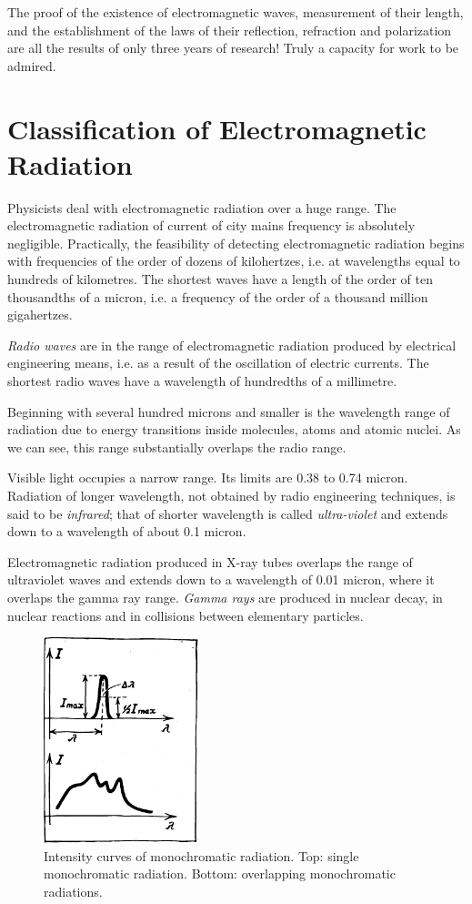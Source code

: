 The proof of the existence of electromagnetic waves, measurement of their length, and the establishment of the laws of their reflection, refraction and polarization are all the results of only three years of research! Truly a capacity for work to be admired.

 
\section{Classification of Electromagnetic Radiation}

Physicists deal with electromagnetic radiation over a huge range. The electromagnetic radiation of current of city mains frequency is absolutely negligible. Practically, the feasibility of detecting electromagnetic radiation begins with frequencies of the order of dozens of kilohertzes, i.e. at wavelengths equal to hundreds of kilometres. The shortest waves have a length of the order of ten thousandths of a micron, i.e. a frequency of the order of a thousand million gigahertzes.

\emph{Radio waves} are in the range of electromagnetic radiation produced by electrical engineering means, i.e. as a result of the oscillation of electric currents. The shortest radio waves have a wavelength of hundredths of a millimetre.

Beginning with several hundred microns and smaller is the wavelength range of radiation due to energy transitions inside molecules, atoms and atomic nuclei. As we can see, this range substantially overlaps the radio range.

Visible light occupies a narrow range. Its limits are 0.38 to 0.74 micron. Radiation of longer wavelength, not obtained by radio engineering techniques, is said to be \emph{infrared}; that of shorter wavelength is called \emph{ultra-violet} and extends down to a wavelength of about 0.1 micron.

Electromagnetic radiation produced in X-ray tubes overlaps the range of ultraviolet waves and extends down to a wavelength of 0.01 micron, where it overlaps the gamma ray range. \emph{Gamma rays} are produced in nuclear decay, in nuclear reactions and in collisions between elementary particles.

\begin{figure}[!ht]
\centering
\includegraphics[width=0.4\textwidth]{figures/fig-05-08.pdf}
\caption{Intensity curves of monochromatic radiation. Top: single monochromatic radiation. Bottom: overlapping monochromatic radiations.}
\label{fig-5.8}
\end{figure}

